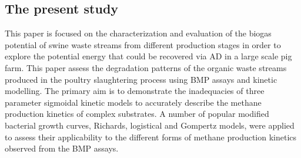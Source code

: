 \subsection{The present study}
This paper is focused on the characterization and evaluation of the biogas potential of swine waste streams from different production stages in order to explore the potential energy that could be recovered via AD in a large scale pig farm. This paper assess the degradation patterns of the organic waste streams produced in the poultry slaughtering process using BMP assays and kinetic modelling. The primary aim is to demonstrate the inadequacies of three parameter sigmoidal kinetic models to accurately describe the methane production kinetics of complex substrates. A number of popular modified bacterial growth curves, Richards, logistical and Gompertz models, were applied to assess their applicability to the different forms of methane production kinetics observed from the BMP assays.